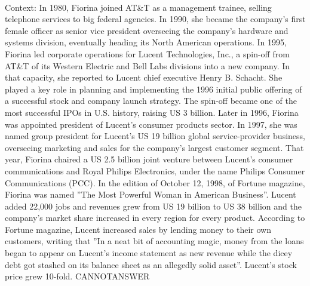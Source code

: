 \documentclass[11pt,a4paper, onecolumn]{article}
\begin{document}
\\ Context: In 1980, Fiorina joined AT&T as a management trainee, selling telephone services to big federal agencies. In 1990, she became the company's first female officer as senior vice president overseeing the company's hardware and systems division, eventually heading its North American operations. In 1995, Fiorina led corporate operations for Lucent Technologies, Inc., a spin-off from AT&T of its Western Electric and Bell Labs divisions into a new company. In that capacity, she reported to Lucent chief executive Henry B. Schacht. She played a key role in planning and implementing the 1996 initial public offering of a successful stock and company launch strategy. The spin-off became one of the most successful IPOs in U.S. history, raising US 3 billion. Later in 1996, Fiorina was appointed president of Lucent's consumer products sector. In 1997, she was named group president for Lucent's US 19 billion global service-provider business, overseeing marketing and sales for the company's largest customer segment. That year, Fiorina chaired a US 2.5 billion joint venture between Lucent's consumer communications and Royal Philips Electronics, under the name Philips Consumer Communications (PCC). In the edition of October 12, 1998, of Fortune magazine, Fiorina was named ''The Most Powerful Woman in American Business''. Lucent added 22,000 jobs and revenues grew from US 19 billion to US 38 billion and the company's market share increased in every region for every product. According to Fortune magazine, Lucent increased sales by lending money to their own customers, writing that ''In a neat bit of accounting magic, money from the loans began to appear on Lucent's income statement as new revenue while the dicey debt got stashed on its balance sheet as an allegedly solid asset''. Lucent's stock price grew 10-fold. CANNOTANSWER
\end{document}
